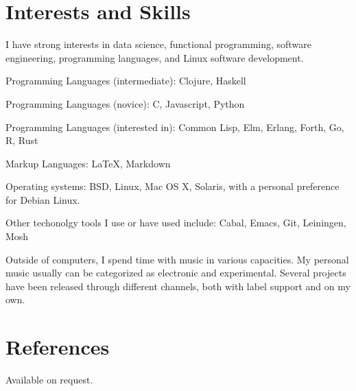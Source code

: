 \documentclass[margintitle,line]{res}
\begin{document}
\begin{resume}
\section{Interests and Skills}

I have strong interests in data science, functional programming,
software engineering, programming languages, and Linux software development.

Programming Languages (intermediate): Clojure, Haskell

Programming Languages (novice): C, Javascript, Python

Programming Languages (interested in): Common Lisp, Elm, Erlang, Forth,
Go, R, Rust

Markup Languages: LaTeX, Markdown

Operating systems: BSD, Linux, Mac OS X, Solaris, with a personal
preference for Debian Linux.

Other techonolgy tools I use or have used include: Cabal, Emacs, Git, Leiningen, Mosh

Outside of computers, I spend time with music in various
capacities. My personal music usually can be categorized as electronic
and experimental. Several projects have been released through
different channels, both with label support and on my own.

\section{References}

Available on request.

\end{resume}
\end{document}
